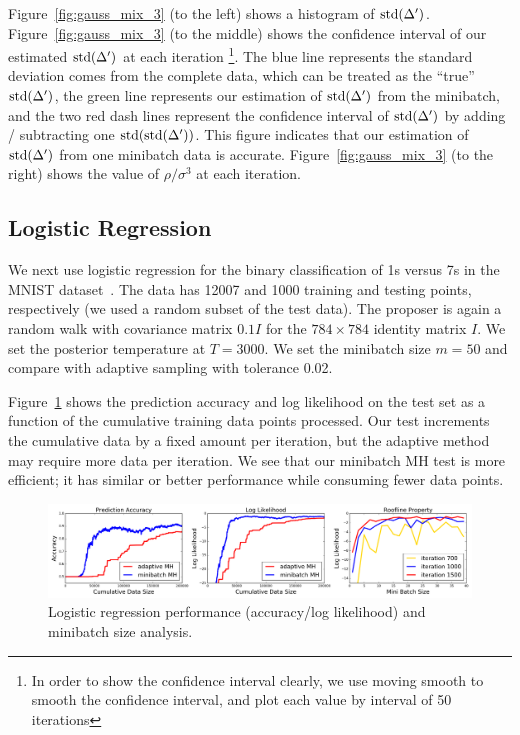 \documentclass{article}
\begin{document}
Figure~\ref{fig:gauss_mix_3} (to the left) shows a histogram of ${\rm
  std}(\Delta')$. Figure~\ref{fig:gauss_mix_3} (to the middle) shows
the confidence interval of our estimated ${\rm std}(\Delta')$ at each
iteration \footnote{In order to show the confidence interval clearly,
  we use moving smooth to smooth the confidence interval, and plot
  each value by interval of 50 iterations}. The blue line represents
the standard deviation comes from the complete data, which can be
treated as the ``true'' ${\rm std}(\Delta')$, the green line
represents our estimation of ${\rm std}(\Delta')$ from the minibatch,
and the two red dash lines represent the confidence interval of ${\rm
  std}(\Delta')$ by adding / subtracting one ${\rm
  std(std(}\Delta'))$. This figure indicates that our estimation of
${\rm std}(\Delta')$ from one minibatch data is
accurate. Figure~\ref{fig:gauss_mix_3} (to the right) shows the value
of $\rho/\sigma^3$ at each iteration. 


\subsection{Logistic Regression}\label{ssec:logistic}

We next use logistic regression for the binary classification of 1s versus 7s in the MNIST
dataset~\cite{lecun-mnisthandwrittendigit-2010}. The data has 12007 and 1000 training and testing
points, respectively (we used a random subset of the test data). The proposer is again a random walk
with covariance matrix $0.1I$ for the $784\times 784$ identity matrix $I$. We set the posterior
temperature at $T=3000$. We set the minibatch size $m=50$ and compare with adaptive sampling with
tolerance 0.02.

Figure~\ref{fig:logistic_fig} shows the prediction accuracy and log likelihood on the test set as a
function of the cumulative training data points processed. Our test increments the cumulative data
by a fixed amount per iteration, but the adaptive method may require more data per iteration.  We
see that our minibatch MH test is more efficient; it has similar or better performance while
consuming fewer data points.

\begin{figure}[t]
    \centering
    \includegraphics[width=1\linewidth]{exp2.png}
    \caption{Logistic regression performance (accuracy/log likelihood) and minibatch size analysis.}
    \label{fig:logistic_fig}
    \vspace{-10pt}
\end{figure}
\end{document}
